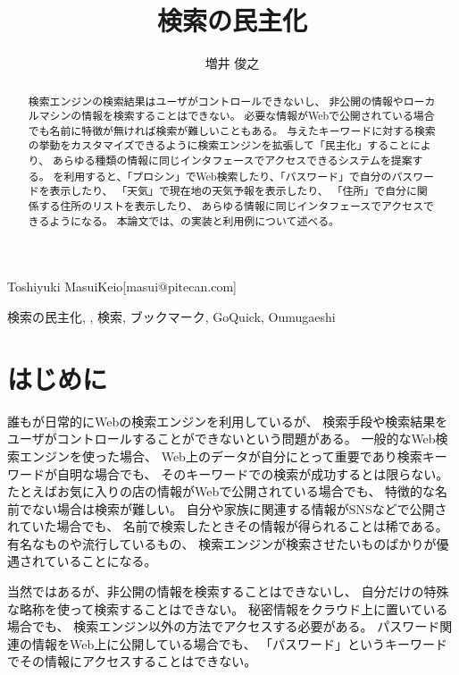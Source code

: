 \documentclass{ipsjprosym}
\begin{document}
\title{検索の民主化}
\author{増井 俊之}{Toshiyuki Masui}{Keio}[masui@pitecan.com]

\long{}

\begin{abstract}
  検索エンジンの検索結果はユーザがコントロールできないし、
  非公開の情報やローカルマシンの情報を検索することはできない。
  必要な情報がWebで公開されている場合でも名前に特徴が無ければ検索が難しいこともある。
  与えたキーワードに対する検索の挙動をカスタマイズできるように検索エンジンを拡張して「民主化」することにより、
  あらゆる種類の情報に同じインタフェースでアクセスできる\textbf{\ds}システムを提案する。
  {\ds}を利用すると、「プロシン」でWeb検索したり、「パスワード」で自分のパスワードを表示したり、
  「天気」で現在地の天気予報を表示したり、
  「住所」で自分に関係する住所のリストを表示したり、
  あらゆる情報に同じインタフェースでアクセスできるようになる。
  本論文では、{\ds}の実装と利用例について述べる。
\end{abstract}

\begin{jkeyword}
  検索の民主化, {\ds}, 検索, ブックマーク, GoQuick, Oumugaeshi
\end{jkeyword}

\maketitle

\section{はじめに}

誰もが日常的にWebの検索エンジンを利用しているが、
検索手段や検索結果をユーザがコントロールすることができないという問題がある。
一般的なWeb検索エンジンを使った場合、
Web上のデータが自分にとって重要であり検索キーワードが自明な場合でも、
そのキーワードでの検索が成功するとは限らない。
たとえばお気に入りの店の情報がWebで公開されている場合でも、
特徴的な名前でない場合は検索が難しい。
自分や家族に関連する情報がSNSなどで公開されていた場合でも、
名前で検索したときその情報が得られることは稀である。
有名なものや流行しているもの、
検索エンジンが検索させたいものばかりが優遇されていることになる。

当然ではあるが、非公開の情報を検索することはできないし、
自分だけの特殊な略称を使って検索することはできない。
秘密情報をクラウド上に置いている場合でも、
検索エンジン以外の方法でアクセスする必要がある。
パスワード関連の情報をWeb上に公開している場合でも、
「パスワード」というキーワードでその情報にアクセスすることはできない。
\end{document}
